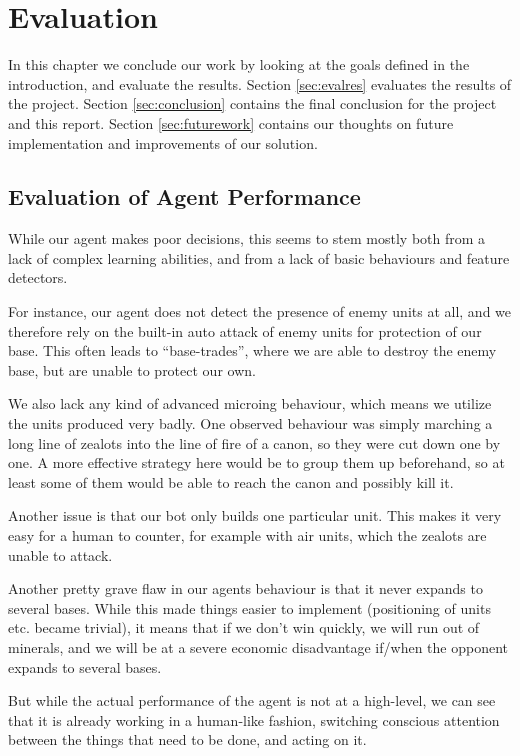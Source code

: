 
\chapter{Evaluation}
In this chapter we conclude our work by looking at the goals defined in the
introduction, and evaluate the results.
Section \ref{sec:evalres} evaluates the results of the project.
Section \ref{sec:conclusion} contains the final conclusion for the project and this report. 
Section \ref{sec:futurework} contains our thoughts on future implementation and improvements of our solution.


\section{Evaluation of Agent Performance}
While our agent makes poor decisions, this seems to stem mostly both from a lack of complex learning abilities, and from a lack of basic behaviours and feature detectors.

For instance, our agent does not detect the presence of enemy units at all, and we therefore rely on the built-in auto attack of enemy units for protection of our base. This often leads to ``base-trades'', where we are able to destroy the enemy base, but are unable to protect our own.

We also lack any kind of advanced microing behaviour, which means we utilize the units produced very badly. One observed behaviour was simply marching a long line of zealots into the line of fire of a canon, so they were cut down one by one. A more effective strategy here would be to group them up beforehand, so at least some of them would be able to reach the canon and possibly kill it.

Another issue is that our bot only builds one particular unit. This makes it very easy for a human to counter, for example with air units, which the zealots are unable to attack.

Another pretty grave flaw in our agents behaviour is that it never expands to several bases. While this made things easier to implement (positioning of units etc. became trivial), it means that if we don't win quickly, we will run out of minerals, and we will be at a severe economic disadvantage if/when the opponent expands to several bases.

But while the actual performance of the agent is not at a high-level, we can see that it is already working in a human-like fashion, switching conscious attention between the things that need to be done, and acting on it.


